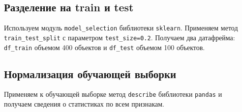 \documentclass[a4paper,12pt]{article}
\begin{document}
\subsection{Разделение на train и test}

Используем модуль \texttt{model\_selection} библиотеки \texttt{sklearn}. Применяем метод \texttt{train\_test\_split} с параметром \texttt{test\_size=0.2}. Получаем два датафрейма: \texttt{df\_train} объемом 400 объектов и \texttt{df\_test} объемом 100 объектов.

\subsection{Нормализация обучающей выборки}

Применяем к обучающей выборке метод \texttt{describe} библиотеки \texttt{pandas} и получаем сведения о статистиках по всем признакам.
\end{document}
